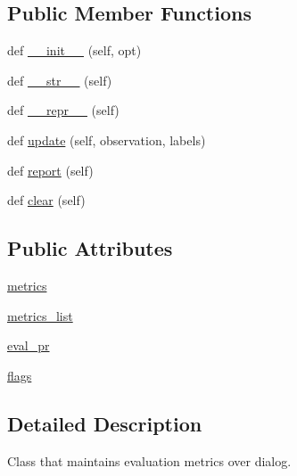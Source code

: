 \subsection*{Public Member Functions}
\begin{DoxyCompactItemize}
\item 
def \hyperlink{classparlai_1_1core_1_1metrics_1_1Metrics_a58ecf4b635e97145e7cea37acac9f8d8}{\+\_\+\+\_\+init\+\_\+\+\_\+} (self, opt)
\item 
def \hyperlink{classparlai_1_1core_1_1metrics_1_1Metrics_a3d15255e3daf76e9aeabd23c94f879cf}{\+\_\+\+\_\+str\+\_\+\+\_\+} (self)
\item 
def \hyperlink{classparlai_1_1core_1_1metrics_1_1Metrics_a652e6f48f5754c1365f18a7f2c86353b}{\+\_\+\+\_\+repr\+\_\+\+\_\+} (self)
\item 
def \hyperlink{classparlai_1_1core_1_1metrics_1_1Metrics_ab1a5a659f2c5747af5d0b674dc647742}{update} (self, observation, labels)
\item 
def \hyperlink{classparlai_1_1core_1_1metrics_1_1Metrics_ae96ffa8a0a1044cdcfcf6cf15fa139ee}{report} (self)
\item 
def \hyperlink{classparlai_1_1core_1_1metrics_1_1Metrics_a72759455e9d5ebab2775aed1fa7f952a}{clear} (self)
\end{DoxyCompactItemize}
\subsection*{Public Attributes}
\begin{DoxyCompactItemize}
\item 
\hyperlink{classparlai_1_1core_1_1metrics_1_1Metrics_ad4d95ce9a2d1fdecf7fd9ef7cf282a15}{metrics}
\item 
\hyperlink{classparlai_1_1core_1_1metrics_1_1Metrics_ae0d3620f86dd5cd08e4d1c097ac6dde4}{metrics\+\_\+list}
\item 
\hyperlink{classparlai_1_1core_1_1metrics_1_1Metrics_a6bf169112945fa8e28547e8c4464b5d6}{eval\+\_\+pr}
\item 
\hyperlink{classparlai_1_1core_1_1metrics_1_1Metrics_a8075a929d40c06f5bbae755b98126c71}{flags}
\end{DoxyCompactItemize}


\subsection{Detailed Description}
\begin{DoxyVerb}Class that maintains evaluation metrics over dialog.
\end{DoxyVerb}
 

